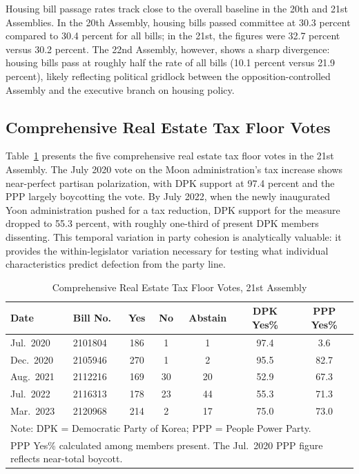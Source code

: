 \documentclass[11pt]{article}
\begin{document}
Housing bill passage rates track close to the overall baseline in the 20th and 21st Assemblies. In the 20th Assembly, housing bills passed committee at 30.3 percent compared to 30.4 percent for all bills; in the 21st, the figures were 32.7 percent versus 30.2 percent. The 22nd Assembly, however, shows a sharp divergence: housing bills pass at roughly half the rate of all bills (10.1 percent versus 21.9 percent), likely reflecting political gridlock between the opposition-controlled Assembly and the executive branch on housing policy.

\subsection{Comprehensive Real Estate Tax Floor Votes}

Table~\ref{tab:votes} presents the five comprehensive real estate tax floor votes in the 21st Assembly. The July 2020 vote on the Moon administration's tax increase shows near-perfect partisan polarization, with DPK support at 97.4 percent and the PPP largely boycotting the vote. By July 2022, when the newly inaugurated Yoon administration pushed for a tax reduction, DPK support for the measure dropped to 55.3 percent, with roughly one-third of present DPK members dissenting. This temporal variation in party cohesion is analytically valuable: it provides the within-legislator variation necessary for testing what individual characteristics predict defection from the party line.

\begin{table}[H]
\centering
\caption{Comprehensive Real Estate Tax Floor Votes, 21st Assembly}
\label{tab:votes}
\begin{tabular}{llccc cc}
\toprule
Date & Bill No. & Yes & No & Abstain & DPK Yes\% & PPP Yes\% \\
\midrule
Jul.\ 2020 & 2101804 & 186 & 1 & 1 & 97.4 & 3.6 \\
Dec.\ 2020 & 2105946 & 270 & 1 & 2 & 95.5 & 82.7 \\
Aug.\ 2021 & 2112216 & 169 & 30 & 20 & 52.9 & 67.3 \\
Jul.\ 2022 & 2116313 & 178 & 23 & 44 & 55.3 & 71.3 \\
Mar.\ 2023 & 2120968 & 214 & 2 & 17 & 75.0 & 73.0 \\
\bottomrule
\multicolumn{7}{l}{\footnotesize Note: DPK = Democratic Party of Korea; PPP = People Power Party.} \\
\multicolumn{7}{l}{\footnotesize PPP Yes\% calculated among members present. The Jul.\ 2020 PPP figure reflects near-total boycott.}
\end{tabular}
\end{table}
\end{document}
